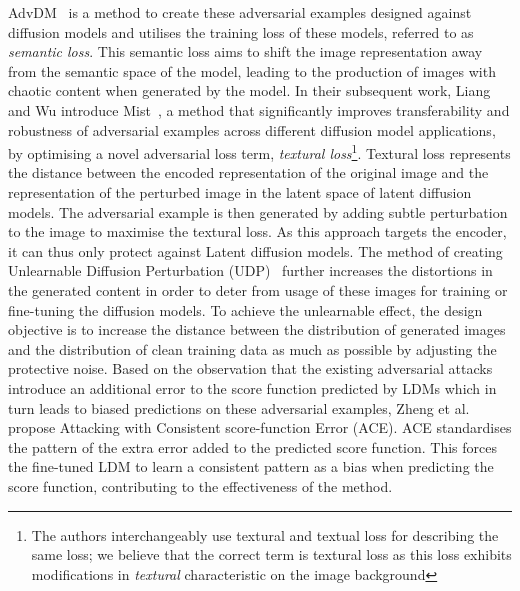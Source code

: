 \documentclass[conference,table]{IEEEtran}
\begin{document}
AdvDM~\cite{liang_adversarial_2023} is a method to create these adversarial examples designed against diffusion models and utilises the training loss of these models, referred to as \textit{semantic loss}. 
This semantic loss aims to shift the image representation away from the semantic space of the model, leading to the production of images with chaotic content when generated by the model.
In their subsequent work, Liang and Wu introduce Mist~\cite{liang_mist_2023}, a method that significantly improves transferability and robustness of adversarial examples across different diffusion model applications, by optimising a novel adversarial loss term, \textit{textural loss}\footnote{The authors interchangeably use textural and textual loss for describing the same loss; we believe that the correct term is textural loss as this loss exhibits modifications in \textit{textural} characteristic on the image background}. 
Textural loss represents the distance between the encoded representation of the original image and the representation of the perturbed image in the latent space of latent diffusion models. 
The adversarial example is then generated by adding subtle perturbation to the image to maximise the textural loss. As this approach targets the encoder, it can thus only protect against Latent diffusion models. 
The method of creating Unlearnable Diffusion Perturbation (UDP)~\cite{zhao_unlearnable_2023} further increases the distortions in the generated content in order to deter from usage of these images for training or fine-tuning the diffusion models. 
To achieve the unlearnable effect, the design objective is to increase the distance between the distribution of generated images and the distribution of clean training data as much as possible by adjusting the protective noise.
Based on the observation that the existing adversarial attacks introduce an additional error to the score function predicted by LDMs which in turn leads to biased predictions on these adversarial examples, Zheng et al.~\cite{zheng_understanding_2023} propose Attacking with Consistent score-function Error (ACE).
ACE standardises the pattern of the extra error added to the predicted score function. 
This forces the fine-tuned LDM to learn a consistent pattern as a bias when predicting the score function, contributing to the effectiveness of the method.
\end{document}
